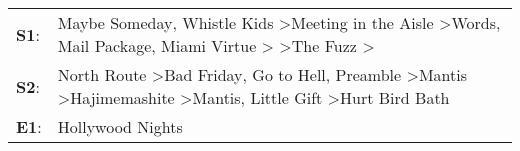 \begin{supertabular}{p{0.03\textwidth}p{0.92\textwidth}}
 \textbf{S1}:  &  Maybe Someday\textsuperscript{}, \enspace Whistle Kids\textsuperscript{} \textgreater \enspace Meeting in the Aisle\textsuperscript{} \textgreater \enspace Words\textsuperscript{}, \enspace Mail Package\textsuperscript{}, \enspace Miami Virtue\textsuperscript{} \textgreater {}\textsuperscript{} \textgreater \enspace The Fuzz\textsuperscript{} \textgreater {}\textsuperscript{}  \enspace  \\
 \textbf{S2}:  &   North Route\textsuperscript{} \textgreater \enspace Bad Friday\textsuperscript{}, \enspace Go to Hell\textsuperscript{}, \enspace Preamble\textsuperscript{} \textgreater \enspace Mantis\textsuperscript{} \textgreater \enspace Hajimemashite\textsuperscript{} \textgreater \enspace Mantis\textsuperscript{}, \enspace Little Gift\textsuperscript{} \textgreater \enspace Hurt Bird Bath\textsuperscript{}  \enspace  \\
 \textbf{E1}:  &                                                                                                                                                                                                                                                                                                                                                                                Hollywood Nights\textsuperscript{}  \enspace  \\
\end{supertabular}
